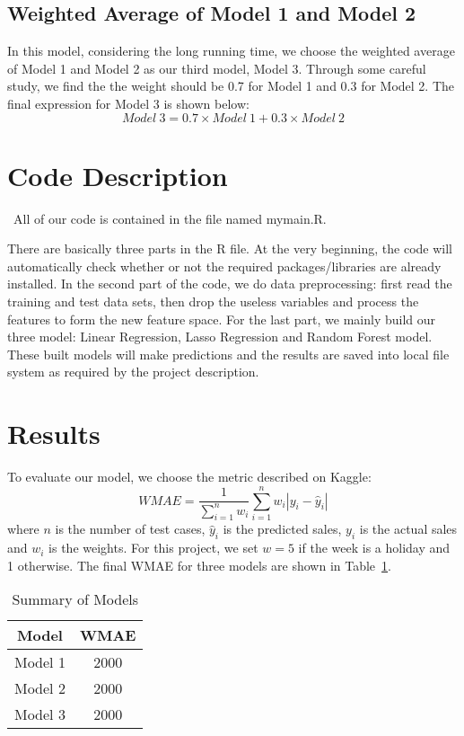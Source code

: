\documentclass[12pt]{article}
\begin{document}
\subsection{Weighted Average of Model 1 and Model 2}
In this model, considering the long running time, we choose the weighted average of Model 1 and Model 2 as our third model, Model 3. Through some careful study, we find the the weight should be 0.7 for Model 1 and 0.3 for Model 2. The final expression for Model 3 is shown below:
\begin{equation}
Model \  3 = 0.7 \times Model \  1 + 0.3 \times Model \  2
\end{equation}


\section{Code Description}
\quad\ All of our code is contained in the file named mymain.R. 


There are basically three parts in the R file. At the very beginning, the code will automatically check whether or not the required packages/libraries are already installed. In the second part of the code, we do data preprocessing: first read the training and test data sets, then drop the useless variables and process the features to form the new feature space. For the last part, we mainly build our three model: Linear Regression, Lasso Regression and Random Forest model. These built models will make predictions and the results are saved into local file system as required by the project description.

\section{Results}

To evaluate our model, we choose the metric described on Kaggle:
\begin{equation}
WMAE = \frac{1}{\sum_{i=1}^n w_i} \sum_{i=1}^n w_i | y_i - \hat{y}_i |
\end{equation}
where $n$ is the number of test cases, $\hat{y}_i$ is the predicted sales, $y_i$ is the actual sales and $w_i$ is the weights. For this project, we set $w=5$ if the week is a holiday and 1 otherwise. The final WMAE for three models are shown in Table~\ref{result}.

\begin{table}[htb]
 \caption{Summary of Models} \label{result}
 \vspace{0.1in}
\begin{center}
  \begin{tabular}{  c  c  }
  
    \hline
    Model          &WMAE     \\ \hline
    Model 1         & 2000    \\ \hline
    Model 2         & 2000    \\ \hline
    Model 3         & 2000    \\ \hline
  \end{tabular}
\end{center}
\end{table}
\end{document}
